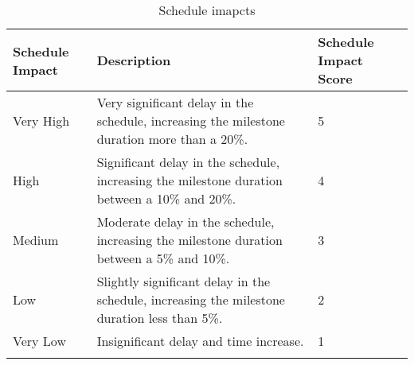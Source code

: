 \begin{longtable}[H]{l >{\raggedright\arraybackslash}p{6.6cm} p{4cm}}
	
	\toprule[2pt]
	
	\textbf{Schedule Impact} &  \textbf{Description}  & \textbf{Schedule Impact Score} \\
	
	\midrule [1.5pt]
	\endhead
	
	Very High & Very significant delay in the schedule, increasing the milestone duration more than a 20\%.  & 5
	\vspace{0.2cm} \\
	
	\midrule
	
	High & Significant delay in the schedule, increasing the milestone duration between a 10\% and 20\%. & 4
	\vspace{0.2cm} \\
	
	\midrule
	
	Medium & Moderate delay in the schedule, increasing the milestone duration between a 5\% and 10\%. & 3
	\vspace{0.2cm} \\

	\midrule

	Low & Slightly significant delay in the schedule, increasing the milestone duration less than 5\%. & 2
	\vspace{0.2cm} \\

	\midrule

	Very Low & Insignificant delay and time increase. & 1
	\vspace{0.2cm} \\
		
	\bottomrule[2pt]
	
	\caption{Schedule imapcts}

\end{longtable}




